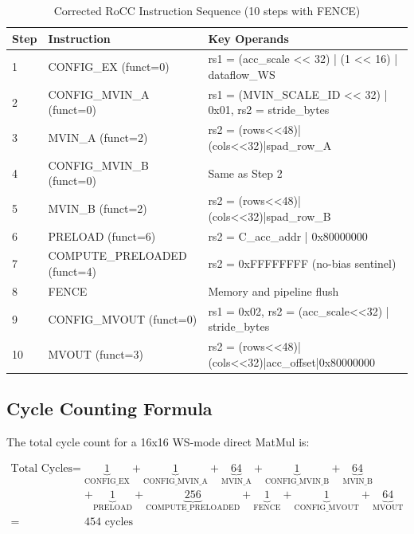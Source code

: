 \documentclass[12pt,a4paper]{article}
\begin{document}
\begin{table}[H]
\centering
\begin{tabular}{|p{}|p{}|p{}|}
\hline
\textbf{Step} & \textbf{Instruction} & \textbf{Key Operands} \\
\hline
1 & CONFIG\_EX (funct=0) & rs1 = (acc\_scale << 32) | (1 << 16) | dataflow\_WS \\
\hline
2 & CONFIG\_MVIN\_A (funct=0) & rs1 = (MVIN\_SCALE\_ID << 32) | 0x01, rs2 = stride\_bytes \\
\hline
3 & MVIN\_A (funct=2) & rs2 = (rows<<48)|(cols<<32)|spad\_row\_A \\
\hline
4 & CONFIG\_MVIN\_B (funct=0) & Same as Step 2 \\
\hline
5 & MVIN\_B (funct=2) & rs2 = (rows<<48)|(cols<<32)|spad\_row\_B \\
\hline
6 & PRELOAD (funct=6) & rs2 = C\_acc\_addr | 0x80000000 \\
\hline
7 & COMPUTE\_PRELOADED (funct=4) & rs2 = 0xFFFFFFFF (no-bias sentinel) \\
\hline
8 & FENCE & Memory and pipeline flush \\
\hline
9 & CONFIG\_MVOUT (funct=0) & rs1 = 0x02, rs2 = (acc\_scale<<32) | stride\_bytes \\
\hline
10 & MVOUT (funct=3) & rs2 = (rows<<48)|(cols<<32)|acc\_offset|0x80000000 \\
\hline
\end{tabular}
\caption{Corrected RoCC Instruction Sequence (10 steps with FENCE)}
\end{table}

\subsection{Cycle Counting Formula}

The total cycle count for a 16x16 WS-mode direct MatMul is:

\[
\begin{aligned}
\text{Total Cycles} = & \underbrace{1}_{\text{CONFIG\_EX}} + \underbrace{1}_{\text{CONFIG\_MVIN\_A}} + \underbrace{64}_{\text{MVIN\_A}} + \underbrace{1}_{\text{CONFIG\_MVIN\_B}} + \underbrace{64}_{\text{MVIN\_B}} \\
& + \underbrace{1}_{\text{PRELOAD}} + \underbrace{256}_{\text{COMPUTE\_PRELOADED}} + \underbrace{1}_{\text{FENCE}} + \underbrace{1}_{\text{CONFIG\_MVOUT}} + \underbrace{64}_{\text{MVOUT}} \\
= & 454 \text{ cycles}
\end{aligned}
\]
\end{document}
